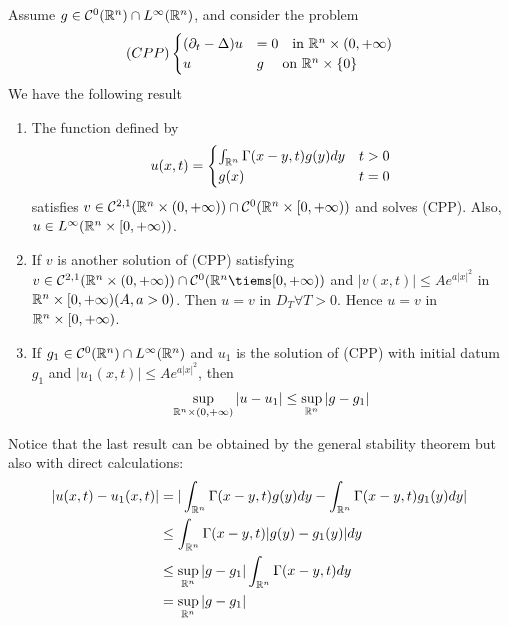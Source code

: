\begin{PropBox}
    \begin{Cor}
    Assume $g \in \mathcal{C}^0(\mathbb{R}^n) \cap L^\infty(\mathbb{R}^n)$, and consider the problem
    \begin{equation*}
    (CPP)
        \begin{cases}
            (\partial_t - \Delta) u&=0 \quad \text{in } \mathbb{R}^n \times (0,+\infty)\\
            u&g \quad \text{ on } \mathbb{R}^n \times \{0\}
        \end{cases}
    \end{equation*}
    We have the following result 
    \begin{enumerate}
        \item The function defined by 
        \begin{equation*}
        u(x,t) = 
            \begin{cases}
                \int_{\mathbb{R}^n} \Gamma(x-y,t) g(y) dy & t > 0\\
                g(x) & t= 0
            \end{cases}
        \end{equation*}
        satisfies $v \in \mathcal{C}^{2,1}(\mathbb{R}^n \times (0,+\infty)) \cap \mathcal{C}^0(\mathbb{R}^n \times [0,+\infty))$ and solves (CPP). Also, $u \in L^\infty(\mathbb{R}^n \times [0,+\infty))$.
        \item If $v$ is another solution of (CPP) satisfying $v \in \mathcal{C}^{2,1}(\mR^n \times (0,+\infty)) \cap \mathcal{C}^0(\mR^n \tiems [0,+\infty))$ and $|v(x,t)| \leq A e^{a |x|^2}$ in $\mathbb{R}^n \times [0,+\infty) (A,a > 0)$. Then $u = v$ in $D_T \forall T > 0$. Hence $u=v$ in $\mathbb{R}^n \times [0,+\infty)$. 
        \item If $g_1 \in \mathcal{C}^0(\mathbb{R}^n) \cap L^\infty(\mathbb{R}^n)$ and $u_1$ is the solution of (CPP) with initial datum $g_1$ and $|u_1(x,t)| \leq A e^{a |x|^2}$, then 
        \begin{equation*}
            \sup_{\mathbb{R}^n \times (0,+\infty)} |u-u_1| \leq \sup_{\mathbb{R}^n} |g-g_1|
        \end{equation*}
    \end{enumerate}
    \end{Cor}
\end{PropBox}
Notice that the last result can be obtained by the general stability theorem but also with direct calculations:
\begin{align*}
    |u(x,t) - u_1(x,t)| &= |\int_{\mathbb{R}^n} \Gamma(x-y,t) g(y) dy - \int_{\mathbb{R}^n} \Gamma(x-y,t)g_1(y) dy| \\
    &\leq \int_{\mathbb{R}^n} \Gamma(x-y,t) |g(y)-g_1(y)| dy \\
    &\leq \sup_{\mathbb{R}^n} |g-g_1| \int_{\mathbb{R}^n} \Gamma(x-y,t) dy \\
    &= \sup_{\mathbb{R}^n} |g-g_1|
\end{align*}



